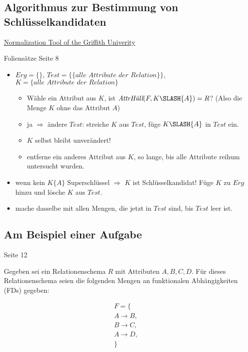 \documentclass{lehramt-informatik-haupt}
\begin{document}
\subsection{Algorithmus zur Bestimmung von Schlüsselkandidaten}

\href{http://www.ict.griffith.edu.au/~jw/normalization/ind.php}
{Normalization Tool of the Griffith Univerity}

Foliensätze Seite 8

\begin{itemize}
\item
$Erg = \{\}$,
$Test = \{\{\textit{alle Attribute der Relation}\}\}$,
$K = \{\textit{alle Attribute der Relation}\}$

\begin{itemize}
\item Wähle ein Attribut aus $K$, ist
$\textit{AttrHüll}(F,K \SLASH \{A\}) = R$?
(Also die Menge $K$ ohne das Attribut $A$)

\item ja $\Rightarrow$ ändere $\textit{Test}$:
streiche $K$ aus $\textit{Test}$, füge $K \SLASH \{A\}$ in $\textit{Test}$ ein.

\item $K$ selbst bleibt unverändert!

\item entferne ein anderes Attribut aus $K$, so lange, bis alle
Attribute reihum untersucht wurden.
\end{itemize}

\item wenn kein $K\{A\}$ Superschlüssel $\Rightarrow$
$K$ ist Schlüsselkandidat!
Füge $K$ zu $Erg$ hinzu und lösche $K$ aus $\textit{Test}$.

\item mache dasselbe mit allen Mengen, die jetzt in $\textit{Test}$ sind,
bis $\textit{Test}$ leer ist.

\end{itemize}

\subsection{Am Beispiel einer Aufgabe}

Seite 12

Gegeben sei ein Relationenschema $R$ mit Attributen $A, B, C, D$. Für
dieses Relationenschema seien die folgenden Mengen an funktionalen
Abhängigkeiten (FDs) gegeben:

\begin{multline*}
F = \{ \\
  A \rightarrow B,\\
  B \rightarrow C,\\
  A \rightarrow D,\\
\}
\end{multline*}
\end{document}
